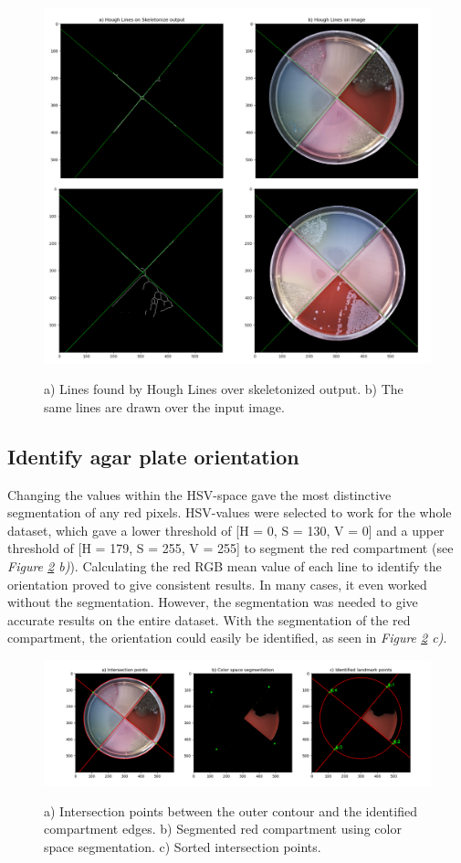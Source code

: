 \begin{figure}[H]
    \centering
      \includegraphics[width=.81\linewidth]{figures/PDF/Hough_lines_double.pdf}\\
    \caption{a) Lines found by Hough Lines over skeletonized output. b) The same lines are drawn over the input image.}
    \label{fig:result houghlines}
\end{figure}

\subsection{Identify agar plate orientation}
Changing the values within the HSV-space gave the most distinctive segmentation of any red pixels. HSV-values were selected to work for the whole dataset, which gave a lower threshold of [H = 0, S = 130, V = 0] and a upper threshold of [H = 179, S = 255, V = 255] to segment the red compartment (see \textit{Figure \ref{fig:result segmentation} b)}). Calculating the red RGB mean value of each line to identify the orientation proved to give consistent results. In many cases, it even worked without the segmentation. However, the segmentation was needed to give accurate results on the entire dataset. With the segmentation of the red compartment, the orientation could easily be identified, as seen in \textit{Figure \ref{fig:result segmentation} c)}. 

\begin{figure}[H]
    \centering
      \includegraphics[width=.93\linewidth]{figures/PDF/Segmentation.pdf}\\
    \caption{a) Intersection points between the outer contour and the identified compartment edges. b) Segmented red compartment using color space segmentation. c) Sorted intersection points. }
    \label{fig:result segmentation}
\end{figure}


